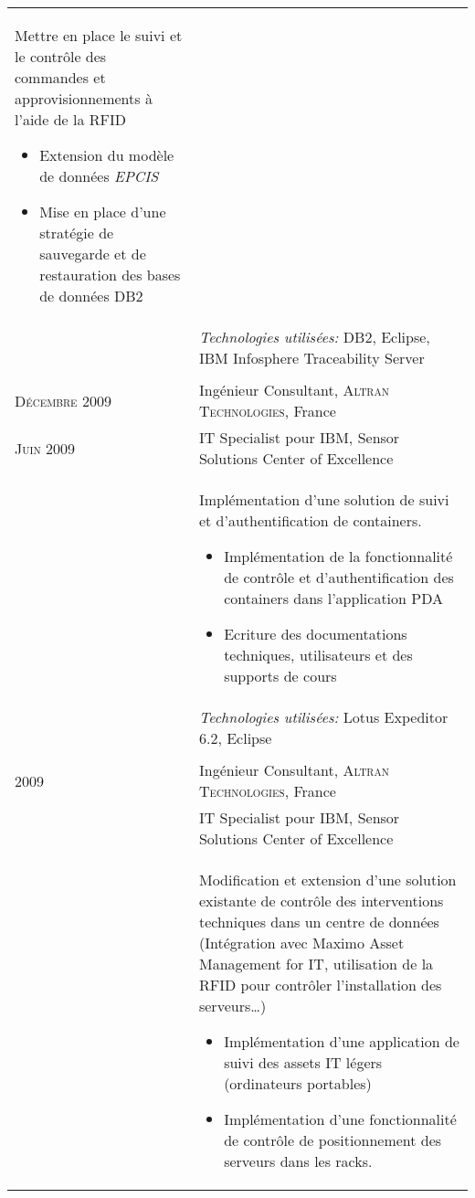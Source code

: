\begin{longtable}{R{2.5cm}|p{14.8cm}}
{ 	 	Mettre en place le suivi et le contrôle des commandes et approvisionnements à l'aide de la RFID
 		\begin{itemize}
			\item Extension du modèle de données \emph{EPCIS}
			\item Mise en place d'une stratégie de sauvegarde et de restauration des bases de données DB2
		\end{itemize}
		\vspace{-1em}
 	}\\&
 	\footnotesize{\emph{Technologies utilisées:} DB2, Eclipse, IBM Infosphere Traceability Server }\\
  \\
 	\textsc{Décembre 2009} & Ingénieur Consultant, \textsc{Altran Technologies}, France\\
 	\textsc{Juin 2009}& IT Specialist pour IBM, Sensor Solutions Center of Excellence\\&
 	\footnotesize{
 	 	Implémentation d'une solution de suivi et d'authentification de containers. 
 		\begin{itemize}
 		  	\item Implémentation de la fonctionnalité de contrôle et d'authentification des containers dans l'application PDA
			\item Ecriture des documentations techniques, utilisateurs et des supports de cours
		\end{itemize}
		\vspace{-1em}
 	}\\&
 \footnotesize{\emph{Technologies utilisées:} Lotus Expeditor 6.2, Eclipse }\\ 	
   \\
 	\textsc{2009} & Ingénieur Consultant, \textsc{Altran Technologies}, France\\
 	& IT Specialist pour IBM, Sensor Solutions Center of Excellence\\&
 	\footnotesize{
 	 	Modification et extension d'une solution existante de contrôle des interventions techniques dans un centre de données 
 	 	(Intégration avec Maximo Asset Management for IT, utilisation de la RFID pour contrôler l'installation des serveurs\ldots)
 		\begin{itemize}
 		  	\item Implémentation d'une application de suivi des assets IT légers (ordinateurs portables)
 		  	\item Implémentation d'une fonctionnalité de contrôle de positionnement des serveurs dans les racks.

\end{itemize}}
\end{longtable}

